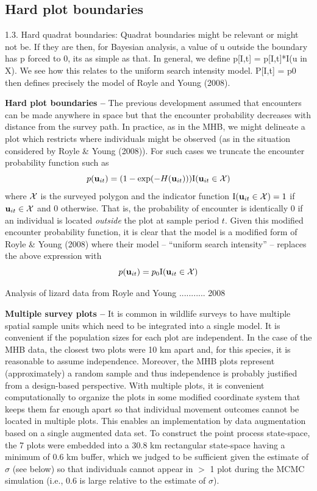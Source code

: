 \subsection{Hard plot boundaries}

1.3. Hard quadrat boundaries: Quadrat boundaries might be relevant or might not be.  If they are then, for Bayesian analysis, a value of u outside the boundary has p forced to 0, its as simple as that. 
In general, we define p[I,t] = p[I,t]*I(u in X).
We see how this relates to the uniform search intensity model.  P[I,t] = p0 then defines precisely the model of Royle and Young (2008). 


{\bf Hard plot boundaries -- } The previous development assumed that
encounters can be made anywhere in space but that the encounter
probability decreases with distance from the survey path. In practice,
as in the MHB, we might delineate a plot which restricts where
individuals might be observed (as in the situation considered by Royle
\& Young (2008)). For such cases we truncate the encounter
probability function such as
\[
p({\bf u}_{it}) = (1- \exp(-H({\bf u}_{it}))) \mbox{I}({\bf u}_{it} \in {\cal X})
\]
where ${\cal X}$ is the surveyed polygon
and the indicator function
$\mbox{I}({\bf u}_{it} \in {\cal X}) = 1$ if
${\bf u}_{it} \in {\cal X}$ and 0 otherwise.
That is, the probability of
encounter is identically 0 if an individual is located {\it outside}
the plot at sample period $t$. Given this modified encounter
probability function, it is clear that the model is a modified form of
Royle \& Young (2008) where their model -- ``uniform search
intensity'' -- replaces the above expression with
\[
p({\bf u}_{it}) = p_{0} \mbox{I}({\bf u}_{it} \in {\cal X})
\]

Analysis of lizard data from Royle and Young ........... 2008

{\bf Multiple survey plots -- } It is common in wildlife surveys to
have multiple spatial sample units which need to be integrated into a
single model. It is convenient if the population sizes for each plot
are independent.
In the case of the MHB data, the closest two plots were 10
km apart and, for this species, it is reasonable to assume
independence. Moreover, the MHB plots represent (approximately) a
random sample and thus independence is probably justified from a
design-based perspective.  
With multiple plots, it is
convenient computationally to organize the plots in some modified
coordinate system that keeps them far enough apart so that individual
movement outcomes
cannot be located in multiple plots. This enables an
implementation by data augmentation based on a single augmented data
set.  
To construct the
point process state-space, the 7 plots were embedded into a 30.8 km
rectangular state-space having a minimum of 0.6 km buffer, which we
judged to be sufficient given the estimate of $\sigma$ (see below)
so that individuals cannot appear in $>$ 1 plot during the MCMC
simulation (i.e., $0.6$ is large
relative to the estimate of $\sigma$).





